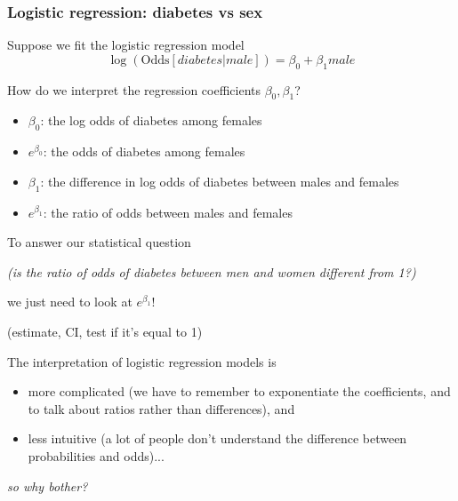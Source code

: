 \documentclass[12pt, 
hyperref={colorlinks=true, linkcolor=blue, urlcolor=cyan}]{beamer}
\begin{document}
\begin{frame}
\frametitle{Logistic regression: diabetes vs sex}

Suppose we fit the logistic regression model $$\log\left(\text{Odds}[diabetes | male]\right) = \beta_0 + \beta_1 male$$

\vspace{-0.2cm}

How do we interpret the regression coefficients $\beta_0, \beta_1$? \vspace{-0.3cm}
\begin{itemize}
\item $\beta_0$: \pause the log odds of diabetes among females \pause
\item[] \color{blue} $e^{\beta_0}$: the odds of diabetes among females \pause \color{black}
\item $\beta_1$: \pause the difference in log odds of diabetes between males and females \pause 
\item[] \color{blue} $e^{\beta_1}$: the ratio of odds between males and females \color{black}
\end{itemize}

\vspace{-0.2cm}
To answer our statistical question \begin{small}\textit{(is the ratio of odds of diabetes between men and women different from 1?)}\end{small} we just need to look at $e^{\beta_1}$! \begin{small} (estimate, CI, test if it's equal to 1) \end{small}
\end{frame}

\begin{frame}
The interpretation of logistic regression models is
\begin{itemize}
\item[] \color{blue} more complicated \color{black} (we have to remember to exponentiate the coefficients, and to talk about ratios rather than differences), and
\item[] \color{orange} less intuitive \color{black} (a lot of people don't understand the difference between probabilities and odds)...
\end{itemize}
\textit{so why bother?}
\end{frame}
\end{document}
